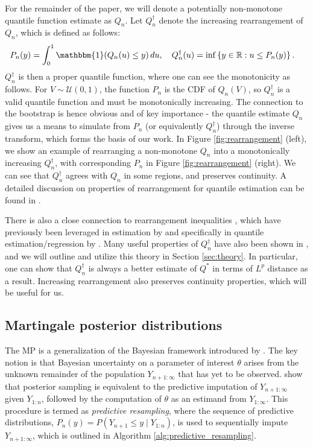 \documentclass[11pt,a4paper]{article}
\newcommand{\R}{\mathbb{R}}
\newcommand{\Ind}{\mathbbm{1}}
\begin{document}
For the remainder of the paper, we will denote a potentially non-monotone quantile function estimate as $Q_n$. 
Let $Q_n^{\dagger}$ denote the increasing rearrangement of $Q_n$, which is defined as follows:
\begin{equation}\label{eq:rearrangement}
\begin{aligned}
    P_n(y) &= \int_0^1 \Ind(Q_n(u) \leq y)\, du,\quad 
    Q_n^{\dagger}(u) =  \inf\left\{y \in \R: u \leq P_n(y)\right\}.
\end{aligned}
\end{equation}
$Q_n^{\dagger}$  is then a proper quantile function, where one can see the monotonicity as follows. For $V \sim \mathcal{U}(0,1)$, the function $P_n$ is the CDF of $Q_n\left(V \right)$, so $Q_n^{\dagger}$ is a valid quantile function and must be monotonically increasing. The connection to the bootstrap is hence obvious and of key importance - the quantile estimate $Q_n$ gives us a means to simulate from $P_n$ (or equivalently $Q_n^{\dagger}$) through the inverse transform, which forms the basis of our work. In {Figure \ref{fig:rearrangement} (left)}, we show an example of rearranging a non-monotone $Q_n$ into a monotonically increasing $Q_n^{\dagger}$, with corresponding $P_n$ in {Figure \ref{fig:rearrangement} (right)}. We can see that $Q_n^{\dagger}$ agrees with $Q_n$ in some regions, and preserves continuity. A detailed discussion on properties of rearrangement for quantile estimation can be found in {\cite{Chernozhukov2010}}.

There is also a close connection to rearrangement inequalities \citep{Hardy1952}, which have previously been leveraged in estimation by \cite{Chernozhukov2009} and specifically in quantile estimation/regression by \cite{Chernozhukov2010}.  Many useful properties of $Q_n^{\dagger}$ have also been shown in \cite{Chernozhukov2010}, and we will outline and utilize this theory in Section \ref{sec:theory}. In particular, one can show that $Q_n^{\dagger}$ is always a better estimate of $Q^*$ in terms of $L^p$ distance as a result. Increasing rearrangement also preserves continuity properties, which will be useful for us.

\subsection{Martingale posterior distributions}

The MP is a generalization of the Bayesian framework introduced by \cite{Fong2023a}. The key notion is that Bayesian uncertainty on a parameter of interest $\theta$  arises from the unknown remainder of the population $Y_{n+1:\infty}$ that has yet to be observed. \cite{Fong2023a} show that posterior sampling is equivalent to the predictive imputation of $Y_{n+1:\infty}$ given $Y_{1:n}$, followed by the computation of $\theta$ as an estimand from $Y_{1:\infty}$. This procedure is termed as \textit{predictive resampling}, where the sequence of predictive distributions, $P_n(y) = P(Y_{n+1} \leq y \mid Y_{1:n})$, is used to sequentially impute $Y_{n+1:\infty}$, which is outlined in {Algorithm \ref{alg:predictive_resampling}}.
\end{document}
